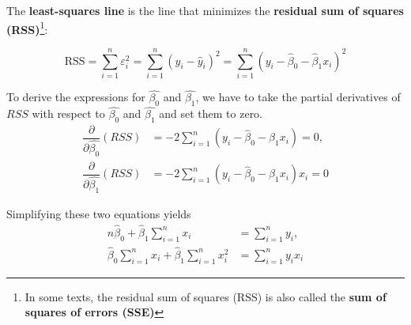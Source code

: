 \documentclass[twoside]{book}
\begin{document}
\begin{center}
\end{center}

The \textbf{least-squares line} is the line that minimizes the \textbf{residual sum of squares (RSS)}\footnote{In some texts, the residual sum of squares (RSS) is also called the \textbf{sum of squares of errors (SSE)}}:

\begin{textbox}
\[
\text{RSS} = \sum_{i=1}^{n} \varepsilon_i^2 = \sum_{i=1}^{n} (y_i - \hat{y}_i)^2 = \sum_{i=1}^{n} (y_i - \hat{\beta}_0 - \hat{\beta}_1 x_i)^2
\]
\end{textbox}

To derive the expressions for $\hat{\beta_0}$ and $\hat{\beta_1}$, we have to take the partial derivatives of $RSS$ with respect to $\hat{\beta_0}$ and $\hat{\beta_1}$ and set them to zero.
\begin{align*}
    \dfrac{\partial}{\partial \hat{\beta_0}} (RSS) &=-2\sum_{i=1}^{n} (y_i - \hat{\beta}_0 - \hat{\beta}_1 x_i) = 0,\\ \dfrac{\partial}{\partial \hat{\beta_1}} (RSS) &= -2\sum_{i=1}^{n} (y_i - \hat{\beta}_0 - \hat{\beta}_1 x_i)x_i = 0
\end{align*}

Simplifying these two equations yields
\begin{align*}
 n\hat{\beta}_0 + \hat{\beta}_1 \sum_{i=1}^{n}x_i &= \sum_{i=1}^{n} y_i, \\
\hat{\beta}_0\sum_{i=1}^{n}  x_i + \hat{\beta}_1 \sum_{i=1}^{n}x_i^2 &= \sum_{i=1}^{n} y_i x_i
\end{align*}
\end{document}
